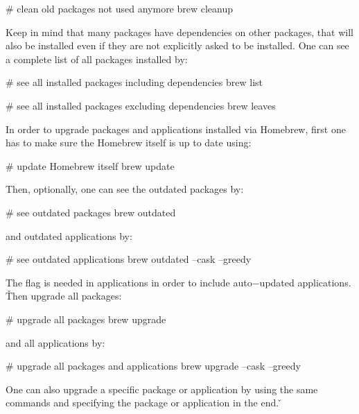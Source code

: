 \begin{bash}
# clean old packages not used anymore
brew cleanup
\end{bash}

Keep in mind that many packages have dependencies on other packages, that will also be installed even if they are not
explicitly asked to be installed. One can see a complete list of all packages installed by:

\begin{bash}
# see all installed packages including dependencies
brew list
\end{bash}

\begin{bash}
# see all installed packages excluding dependencies
brew leaves
\end{bash}

In order to upgrade packages and applications installed via Homebrew, first one has to make sure the Homebrew itself
is up to date using:

\begin{bash}
# update Homebrew itself
brew update
\end{bash}

Then, optionally, one can see the outdated packages by:

\begin{bash}
# see outdated packages
brew outdated
\end{bash}

and outdated applications by:

\begin{bash}
# see outdated applications
brew outdated --cask --greedy
\end{bash}

The flag  is needed in applications in order to include auto$-$updated applications. \v

Then upgrade all packages:

\begin{bash}
# upgrade all packages
brew upgrade
\end{bash}

and all applications by:

\begin{bash}
# upgrade all packages and applications
brew upgrade --cask --greedy
\end{bash}

One can also upgrade a specific package or application by using the same commands and specifying the package or
application in the end. \v

